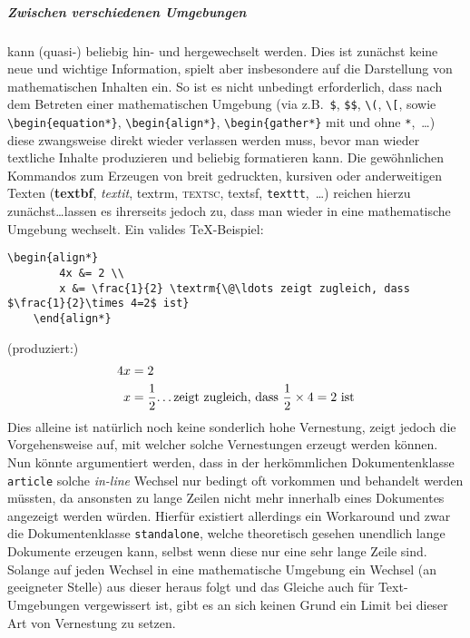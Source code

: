 \subparagraph{Zwischen verschiedenen Umgebungen\label{subpar:envswitch}} kann (quasi-) beliebig hin- und hergewechselt werden. Dies ist zunächst keine neue und wichtige Information, spielt aber insbesondere auf die Darstellung von mathematischen Inhalten ein. So ist es nicht unbedingt erforderlich, dass nach dem Betreten einer mathematischen Umgebung (via z.B.\ \verb|$|, \verb|$$|, \verb|\(|, \verb|\[|, sowie \verb|\begin{equation*}|, \verb|\begin{align*}|, \verb|\begin{gather*}| mit und ohne \texttt{*},~\ldots) diese zwangsweise direkt wieder verlassen werden muss, bevor man wieder textliche Inhalte produzieren und beliebig formatieren kann. Die gewöhnlichen Kommandos zum Erzeugen von breit gedruckten, kursiven oder anderweitigen Texten (\textbf{textbf}, \textit{textit}, \textrm{textrm}, \textsc{textsc}, \textsf{textsf}, \texttt{texttt},~\ldots) reichen hierzu zunächst\ldots lassen es ihrerseits jedoch zu, dass man wieder in eine mathematische Umgebung wechselt. Ein valides \TeX{}-Beispiel: %
\begin{Verbatim}[breaklines=true, breakanywhere=true]
    \begin{align*}
        4x &= 2 \\
        x &= \frac{1}{2} \textrm{\@\ldots zeigt zugleich, dass $\frac{1}{2}\times 4=2$ ist}
    \end{align*}
\end{Verbatim}
(produziert:)
\begin{align*}
    4x &= 2 \\
    x &= \frac{1}{2} \textrm{\@\ldots zeigt zugleich, dass $\frac{1}{2}\times 4=2$ ist}
\end{align*}
Dies alleine ist natürlich noch keine sonderlich hohe Vernestung, zeigt jedoch die Vorgehensweise auf, mit welcher solche Vernestungen erzeugt werden können. Nun könnte argumentiert werden, dass in der herkömmlichen Dokumentenklasse \texttt{article} solche \textit{in-line} Wechsel nur bedingt oft vorkommen und behandelt werden müssten, da ansonsten zu lange Zeilen nicht mehr innerhalb eines Dokumentes angezeigt werden würden. Hierfür existiert allerdings ein Workaround und zwar die Dokumentenklasse \texttt{standalone}, welche theoretisch gesehen unendlich lange Dokumente erzeugen kann, selbst wenn diese nur eine sehr lange Zeile sind.%
Solange auf jeden Wechsel in eine mathematische Umgebung ein Wechsel (an geeigneter Stelle) aus dieser heraus folgt und das Gleiche auch für Text-Umgebungen vergewissert ist, gibt es an sich keinen Grund ein Limit bei dieser Art von Vernestung zu setzen.

